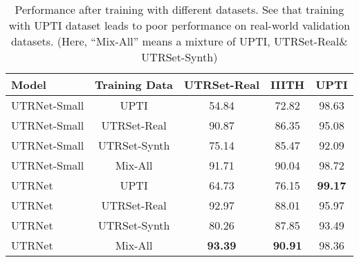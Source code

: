 \documentclass[runningheads]{llncs}
\newcommand{\ModelName}{{UTRNet}\xspace}
\newcommand{\DatasetNameReal}{{UTRSet-Real}\xspace}
\newcommand{\DatasetNameSynth}{{UTRSet-Synth}\xspace}
\begin{document}
\begin{table}[b]
	\centering
	\setlength{\tabcolsep}{8pt}
	\begin{tabular}{lcccc}
		\toprule[1.5pt]
		\textbf{Model} & \textbf{Training Data} & \textbf{\DatasetNameReal} & \textbf{IIITH} & \textbf{UPTI} \\ 
		\midrule[0.5pt]
		\ModelName-Small & UPTI & 54.84 & 72.82 & 98.63 \\
		\ModelName-Small & \DatasetNameReal & 90.87 & 86.35 & 95.08 \\
		\ModelName-Small & \DatasetNameSynth &  75.14 & 85.47 & 92.09 \\
		\ModelName-Small & Mix-All & 91.71 & 90.04 & 98.72 \\ [0.5ex]
		\midrule[0.5pt]
		\ModelName & UPTI &  64.73 & 76.15 & \textbf{99.17} \\
		\ModelName & \DatasetNameReal &  92.97 & 88.01 & 95.97 \\
		\ModelName & \DatasetNameSynth &  80.26 & 87.85 & 93.49 \\
		\ModelName & Mix-All &  \textbf{93.39} & \textbf{90.91} & 98.36 \\ [0.5ex]
		\toprule[1.5pt] 
	\end{tabular}
	\vspace{0.5em}
	\caption{Performance after training with different datasets. See that training with UPTI dataset leads to poor performance on real-world validation datasets. (Here, ``Mix-All'' means a mixture of UPTI, \DatasetNameReal \& \DatasetNameSynth)}
	\label{tab:results_on_datasets}
	\vspace{-2em}
\end{table}
 
\end{document}

